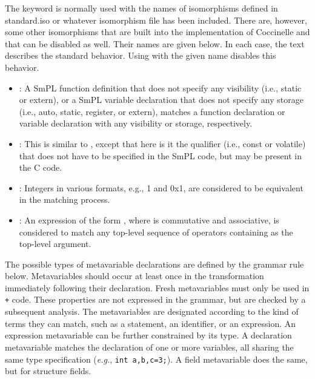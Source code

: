 The keyword  is normally used with the names of
isomorphisms defined in standard.iso or whatever isomorphism file has been
included.  There are, however, some other isomorphisms that are built into
the implementation of Coccinelle and that can be disabled as well.  Their
names are given below.  In each case, the text describes the standard
behavior.  Using  with the given name disables this behavior.

\begin{itemize}
\item {}: A SmPL function definition that does not
  specify any visibility (i.e., static or extern), or a SmPL variable
  declaration that does not specify any storage (i.e., auto, static,
  register, or extern), matches a function declaration or variable
  declaration with any visibility or storage, respectively.
\item {}: This is similar to ,
  except that here is it the qualifier (i.e., const or volatile) that does
  not have to be specified in the SmPL code, but may be present in the C code.
\item {}: Integers in various formats, e.g., 1 and 0x1, are
  considered to be equivalent in the matching process.
\item {}: An expression of the form  
  , where  is commutative and associative, is
  considered to match any top-level sequence of  operators
  containing  as the top-level argument.
\end{itemize}

The possible types of metavariable declarations are defined by the grammar
rule below.  Metavariables should occur at least once in the transformation
immediately following their declaration.  Fresh metavariables must only be
used in {\tt +} code.  These properties are not expressed in the grammar,
but are checked by a subsequent analysis.  The metavariables are designated
according to the kind of terms they can match, such as a statement, an
identifier, or an expression.  An expression metavariable can be further
constrained by its type.  A declaration metavariable matches the
declaration of one or more variables, all sharing the same type
specification ({\em e.g.}, {\tt int a,b,c=3;}).  A field metavariable does
the same, but for structure fields.

